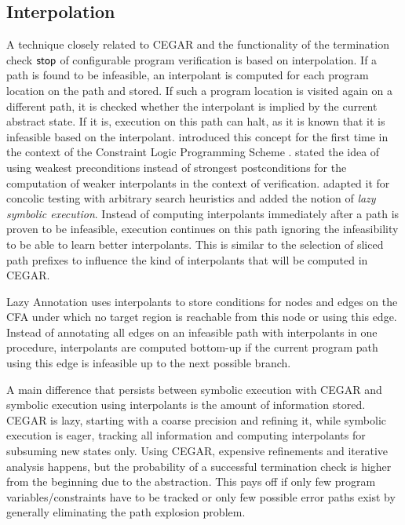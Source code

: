 \subsection*{Interpolation}
A technique closely related to CEGAR and the functionality of the termination check $\operatorname{\operatorname{\mathsf{stop}}}$ of configurable program verification is based on interpolation.
If a path is found to be infeasible, an interpolant is computed for each program location on the path and stored.
If such a program location is visited again on a different path, it is checked whether the interpolant is implied by the current abstract state.
If it is, execution on this path can halt, as it is known that it is infeasible based on the interpolant.
\cite{Jaffar2009} introduced this concept for the first time in the context of the Constraint Logic Programming Scheme \cite{Jaffar1992}.
\cite{Jaffar2012} stated the idea of using weakest preconditions instead of strongest postconditions for the computation of weaker interpolants in the context of verification.
\cite{Jaffar2013} adapted it for concolic testing with arbitrary search heuristics and
\cite{Chu2014} added the notion of \emph{lazy symbolic execution}.
Instead of computing interpolants immediately after a path is proven to be infeasible, execution continues on this path ignoring the infeasibility to be able to learn better interpolants.
This is similar to the selection of sliced path prefixes \cite{Beyer2015} to influence the kind of interpolants that will be computed in CEGAR.

Lazy Annotation \cite{McMillan2010} uses interpolants to store conditions for nodes and edges on the CFA under which no target region is reachable from this node or using this edge.
Instead of annotating all edges on an infeasible path with interpolants in one procedure, interpolants are computed bottom-up if the current program path using this edge is infeasible up to the next possible branch.

A main difference that persists between symbolic execution with CEGAR and symbolic execution using interpolants is the amount of information stored.
CEGAR is lazy, starting with a coarse precision and refining it, while symbolic execution is eager,
tracking all information and computing interpolants for subsuming new states only.
Using CEGAR, expensive refinements and iterative analysis happens,
but the probability of a successful termination check is higher from the beginning due to the abstraction.
This pays off if only few program variables/constraints have to be tracked or only few possible error paths exist
by generally eliminating the path explosion problem.


